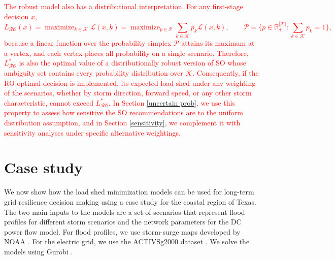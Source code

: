 \documentclass[authoryear,preprint,review,12pt]{elsarticle}\usepackage{amssymb}
\DeclareMathOperator*{\maximize}{maximize}
\begin{document}
\textcolor{red}{The robust model also has a distributional interpretation. For any first-stage decision $x$,
\begin{equation}\label{dro_equivalence}
    L_{\mathcal{RO}}(x) = \maximize_{k \in \mathcal{K}} \mathcal{L}(x,k) = \maximize_{p \in \mathcal{P}} \sum_{k \in \mathcal{K}} p_k \mathcal{L}(x,k), \qquad \mathcal{P} = \Big\{ p \in \mathbb{R}^{|\mathcal{K}|}_{+} : \sum_{k \in \mathcal{K}} p_k = 1 \Big\},
\end{equation}
because a linear function over the probability simplex $\mathcal{P}$ attains its maximum at a vertex, and each vertex places all probability on a single scenario. Therefore, $L_\mathcal{RO}^*$ is also the optimal value of a distributionally robust version of SO whose ambiguity set contains every probability distribution over $\mathcal{K}$. Consequently, if the RO optimal decision is implemented, its expected load shed under any weighting of the scenarios, whether by storm direction, forward speed, or any other storm characteristic, cannot exceed $L_\mathcal{RO}^*$. In Section \ref{uncertain prob}, we use this property to assess how sensitive the SO recommendations are to the uniform distribution assumption, and in Section \ref{sensitivity}, we complement it with sensitivity analyses under specific alternative weightings.}

\vspace{-0.5cm}
\section{Case study} \label{case_study}
We now show how the load shed minimization models can be used for long-term grid resilience decision making using a case study for the coastal region of Texas. The two main inputs to the models are a set of scenarios that represent flood profiles for different storm scenarios and the network parameters for the DC power flow model. For flood profiles, we use storm-surge maps developed by NOAA \cite{MEOW}. For the electric grid, we use the ACTIVSg2000 dataset \cite{activsg2000}. %
We solve the models using Gurobi \cite{gurobi}. 
\end{document}
